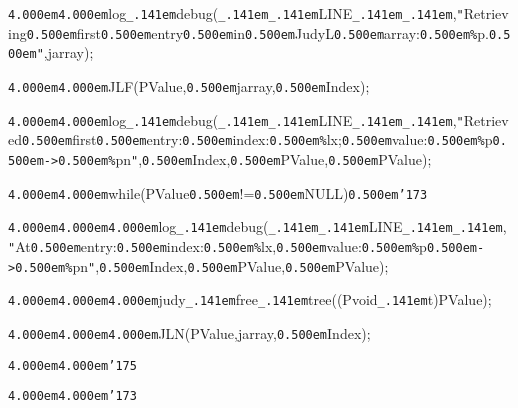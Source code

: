 \noindent
{}{\tt\mc \kern4.000em}{\tt\mc \kern4.000em}log{\tt\_\kern.141em}debug({\tt\_\kern.141em}{\tt\_\kern.141em}LINE{\tt\_\kern.141em}{\tt\_\kern.141em},{\tt "}Retrieving{\tt\mc \kern0.500em}first{\tt\mc \kern0.500em}entry{\tt\mc \kern0.500em}in{\tt\mc \kern0.500em}JudyL{\tt\mc \kern0.500em}array:{\tt\mc \kern0.500em}{\tt\%}p.{\tt\mc \kern0.500em}{\tt "},jarray);

\noindent
{}\hfill

\noindent
{}{\tt\mc \kern4.000em}{\tt\mc \kern4.000em}JLF(PValue,{\tt\mc \kern0.500em}jarray,{\tt\mc \kern0.500em}Index);

\noindent
{}\hfill

\noindent
{}{\tt\mc \kern4.000em}{\tt\mc \kern4.000em}log{\tt\_\kern.141em}debug({\tt\_\kern.141em}{\tt\_\kern.141em}LINE{\tt\_\kern.141em}{\tt\_\kern.141em},{\tt "}Retrieved{\tt\mc \kern0.500em}first{\tt\mc \kern0.500em}entry:{\tt\mc \kern0.500em}index:{\tt\mc \kern0.500em}{\tt\%}lx;{\tt\mc \kern0.500em}value:{\tt\mc \kern0.500em}{\tt\%}p{\tt\mc \kern0.500em}{\tt -}{\tt >}{\tt\mc \kern0.500em}{\tt\%}p{\tt{}}n{\tt "},{\tt\mc \kern0.500em}Index,{\tt\mc \kern0.500em}PValue,{\tt\mc \kern0.500em}{\tt *}PValue);

\noindent
{}\hfill

\noindent
{}{\tt\mc \kern4.000em}{\tt\mc \kern4.000em}while(PValue{\tt\mc \kern0.500em}!={\tt\mc \kern0.500em}NULL){\tt\mc \kern0.500em}{\tt\char'173}

\noindent
{}{\tt\mc \kern4.000em}{\tt\mc \kern4.000em}{\tt\mc \kern4.000em}log{\tt\_\kern.141em}debug({\tt\_\kern.141em}{\tt\_\kern.141em}LINE{\tt\_\kern.141em}{\tt\_\kern.141em},{\tt "}At{\tt\mc \kern0.500em}entry:{\tt\mc \kern0.500em}index:{\tt\mc \kern0.500em}{\tt\%}lx,{\tt\mc \kern0.500em}value:{\tt\mc \kern0.500em}{\tt\%}p{\tt\mc \kern0.500em}{\tt -}{\tt >}{\tt\mc \kern0.500em}{\tt\%}p{\tt{}}n{\tt "},{\tt\mc \kern0.500em}Index,{\tt\mc \kern0.500em}PValue,{\tt\mc \kern0.500em}{\tt *}PValue);

\noindent
{}\hfill

\noindent
{}{\tt\mc \kern4.000em}{\tt\mc \kern4.000em}{\tt\mc \kern4.000em}judy{\tt\_\kern.141em}free{\tt\_\kern.141em}tree((Pvoid{\tt\_\kern.141em}t){\tt *}PValue);

\noindent
{}{\tt\mc \kern4.000em}{\tt\mc \kern4.000em}{\tt\mc \kern4.000em}JLN(PValue,jarray,{\tt\mc \kern0.500em}Index);

\noindent
{}{\tt\mc \kern4.000em}{\tt\mc \kern4.000em}{\tt\char'175}

\noindent
{}{\tt\mc \kern4.000em}{\tt\mc \kern4.000em}{\tt\char'173}

